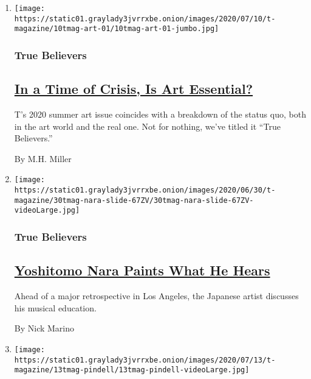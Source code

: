 \begin{enumerate}
\def\labelenumi{\arabic{enumi}.}
\item
  \texttt{[image: https://static01.graylady3jvrrxbe.onion/images/2020/07/10/t-magazine/10tmag-art-01/10tmag-art-01-jumbo.jpg]}

  \hypertarget{true-believers}{%
  \subsubsection{True Believers}\label{true-believers}}

  \hypertarget{in-a-time-of-crisis-is-art-essential}{%
  \subsection{\texorpdfstring{\href{/2020/07/20/t-magazine/museums-galleries-open-art.html}{In
  a Time of Crisis, Is Art
  Essential?}}{In a Time of Crisis, Is Art Essential?}}\label{in-a-time-of-crisis-is-art-essential}}

  T's 2020 summer art issue coincides with a breakdown of the status
  quo, both in the art world and the real one. Not for nothing, we've
  titled it ``True Believers.''

  By M.H. Miller
\item
  \texttt{[image: https://static01.graylady3jvrrxbe.onion/images/2020/06/30/t-magazine/30tmag-nara-slide-67ZV/30tmag-nara-slide-67ZV-videoLarge.jpg]}

  \hypertarget{true-believers-1}{%
  \subsubsection{True Believers}\label{true-believers-1}}

  \hypertarget{yoshitomo-nara-paints-what-he-hears}{%
  \subsection{\texorpdfstring{\href{/2020/07/24/t-magazine/yoshitomo-nara.html}{Yoshitomo
  Nara Paints What He
  Hears}}{Yoshitomo Nara Paints What He Hears}}\label{yoshitomo-nara-paints-what-he-hears}}

  Ahead of a major retrospective in Los Angeles, the Japanese artist
  discusses his musical education.

  By Nick Marino
\item
  \texttt{[image: https://static01.graylady3jvrrxbe.onion/images/2020/07/13/t-magazine/13tmag-pindell/13tmag-pindell-videoLarge.jpg]}


\end{enumerate}
